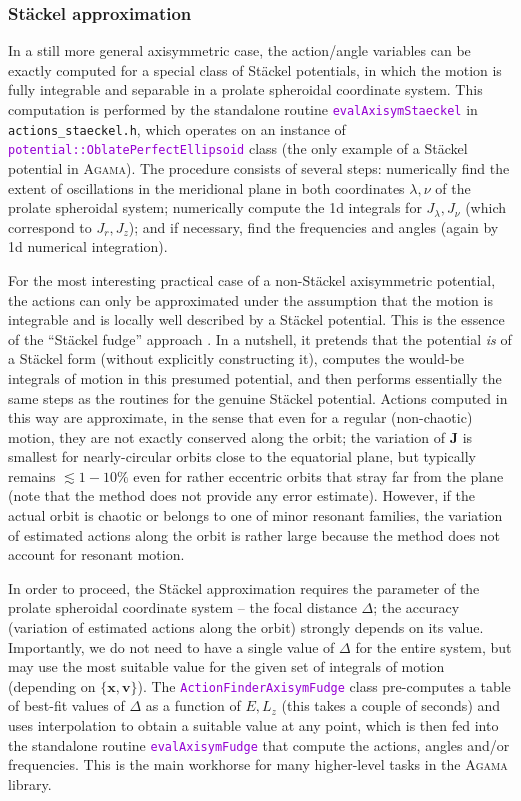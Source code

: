 \documentclass[12pt]{article}
\newcommand{\Agama}{\textsc{Agama}\xspace}
\newcommand{\ttt}[1]{\textcolor{darkviolet}{\texttt{#1}}}
\newcommand{\bv}{\boldsymbol{v}}
\newcommand{\bx}{\boldsymbol{x}}
\newcommand{\bJ}{\boldsymbol{J}}
\begin{document}
\subsubsection{St\"ackel approximation}  \label{sec:ActionsStaeckel}

In a still more general axisymmetric case, the action/angle variables can be exactly computed for a special class of St\"ackel potentials, in which the motion is fully integrable and separable in a prolate spheroidal coordinate system. This computation is performed by the standalone routine \ttt{evalAxisymStaeckel} in \mbox{\texttt{actions_staeckel.h}}, which operates on an instance of \ttt{potential::OblatePerfectEllipsoid} class (the only example of a St\"ackel potential in \Agama). The procedure consists of several steps: numerically find the extent of oscillations in the meridional plane in both coordinates $\lambda, \nu$ of the prolate spheroidal system; numerically compute the 1d integrals for $J_\lambda, J_\nu$ (which correspond to $J_r, J_z$); and if necessary, find the frequencies and angles (again by 1d numerical integration).

For the most interesting practical case of a non-St\"ackel axisymmetric potential, the actions can only be approximated under the assumption that the motion is integrable and is locally well described by a St\"ackel potential. This is the essence of the ``St\"ackel fudge'' approach \cite{Binney2012}. In a nutshell, it pretends that the potential \textit{is} of a St\"ackel form (without explicitly constructing it), computes the would-be integrals of motion in this presumed potential, and then performs essentially the same steps as the routines for the genuine St\"ackel potential. Actions computed in this way are approximate, in the sense that even for a regular (non-chaotic) motion, they are not exactly conserved along the orbit; the variation of $\bJ$ is smallest for nearly-circular orbits close to the equatorial plane, but typically remains $\lesssim 1-10\%$ even for rather eccentric orbits that stray far from the plane (note that the method does not provide any error estimate). However, if the actual orbit is chaotic or belongs to one of minor resonant families, the variation of estimated actions along the orbit is rather large because the method does not account for resonant motion.

In order to proceed, the St\"ackel approximation requires the parameter of the prolate spheroidal coordinate system -- the focal distance $\Delta$; the accuracy (variation of estimated actions along the orbit) strongly depends on its value. Importantly, we do not need to have a single value of $\Delta$ for the entire system, but may use the most suitable value for the given set of integrals of motion (depending on $\{\bx,\bv\}$).
The \ttt{ActionFinderAxisymFudge} class pre-computes a table of best-fit values of $\Delta$ as a function of $E,L_z$ (this takes a couple of seconds) and uses interpolation to obtain a suitable value at any point, which is then fed into the standalone routine \ttt{evalAxisymFudge} that compute the actions, angles and/or frequencies.
This is the main workhorse for many higher-level tasks in the \Agama library.
\end{document}
